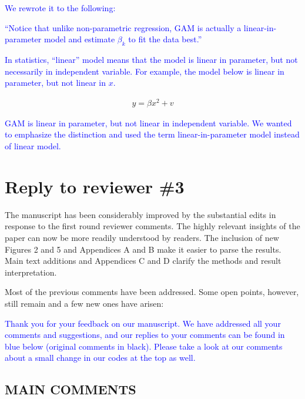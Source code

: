 \documentclass[
]{article}
\begin{document}
\begin{itemize}
\textcolor{blue}{We rewrote it to the following:}

\textcolor{blue}{``Notice that unlike non-parametric regression, GAM is actually a linear-in-parameter model and estimate $\beta_k$ to fit the data best.''}

\textcolor{blue}{In statistics, ``linear'' model means that the model is linear in parameter, but not necessarily in independent variable. For example, the model below is linear in parameter, but not linear in $x$.} 

\begin{align}
  y = \beta x^2 + v
\end{align}  

\textcolor{blue}{ GAM is linear in parameter, but not linear in independent variable. We wanted to emphasize the distinction and used the term linear-in-parameter model instead of linear model.} 

\end{itemize}

\section{Reply to reviewer \#3}

The manuscript has been considerably improved by the substantial edits in response to the first round reviewer comments. The highly relevant insights of the paper can now be more readily understood by readers. The inclusion of new Figures 2 and 5 and Appendices A and B make it easier to parse the results. Main text additions and Appendices C and D clarify the methods and result interpretation.

Most of the previous comments have been addressed. Some open points, however, still remain and a few new ones have arisen:

\textcolor{blue}{Thank you for your feedback on our manuscript. We have addressed all your comments and suggestions, and our replies to your comments can be found in blue below (original comments in black). Please take a look at our comments about a small change in our codes at the top as well.}

\subsection{MAIN COMMENTS}
\end{document}

